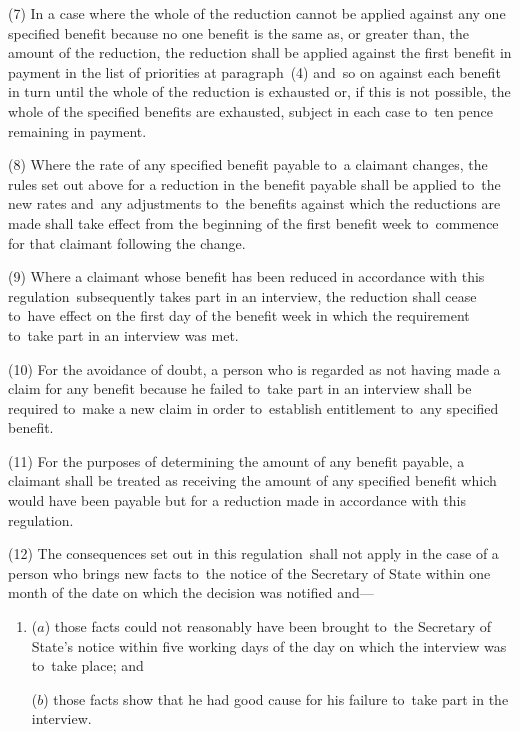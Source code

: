 \documentclass[12pt,a4paper]{article}
\begin{document}
(7) In a case where the whole of the reduction cannot be applied against any one specified benefit because no one benefit is the same as, or greater than, the amount of the reduction, the reduction shall be applied against the first benefit in payment in the list of priorities at paragraph~(4) and~so on against each benefit in turn until the whole of the reduction is exhausted or, if this is not possible, the whole of the specified benefits are exhausted, subject in each case to~ten pence remaining in payment.

(8) Where the rate of any specified benefit payable to~a claimant changes, the rules set out above for a reduction in the benefit payable shall be applied to~the new rates and~any adjustments to~the benefits against which the reductions are made shall take effect from the beginning of the first benefit week to~commence for that claimant following the change.

\enlargethispage{-\baselineskip}

(9) Where a claimant whose benefit has been reduced in accordance with this regulation~subsequently takes part in an interview, the reduction shall cease to~have effect on the first day of the benefit week in which the requirement to~take part in an interview was met.

(10) For the avoidance of doubt, a person who is regarded as not having made a claim for any benefit because he failed to~take part in an interview shall be required to~make a new claim in order to~establish entitlement to~any specified benefit.

(11) For the purposes of determining the amount of any benefit payable, a claimant shall be treated as receiving the amount of any specified benefit which would have been payable but for a reduction made in accordance with this regulation.

(12) The consequences set out in this regulation~shall not apply in the case of a person who brings new facts to~the notice of the Secretary of State within one month of the date on which the decision was notified and—
\begin{enumerate}\item[]
($a$) those facts could not reasonably have been brought to~the Secretary of State’s notice within five working days of the day on which the interview was to~take place; and

($b$) those facts show that he had good cause for his failure to~take part in the interview.
\end{enumerate}
\end{document}
